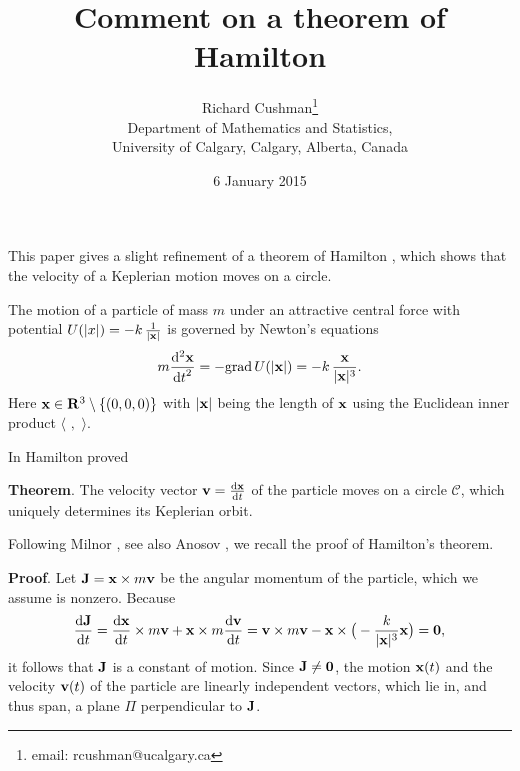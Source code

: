 \documentclass[11pt,openbib]{article}
\title{\textbf{Comment on a theorem of Hamilton}}
\author{Richard Cushman\thanks{email: rcushman@ucalgary.ca} \\ Department of Mathematics and Statistics, \\
University of Calgary, Calgary, Alberta, Canada}
\date{6 January 2015}
\newcommand{\dee}{\mathrm{d}}
\begin{document}
\maketitle
\noindent This paper gives a slight refinement of a theorem of Hamilton \cite{hamilton}, which shows that the velocity of a Keplerian motion moves on a circle. \medskip 

\noindent The motion of a particle of mass $m$ under an attractive central force with potential $U(|x|) = 
-k \,  \frac{1}{|{\bf x}|}$ 
is governed by Newton's equations
\begin{equation}
m \frac{{\dee }^2 {\bf x}}{{\dee t}^2} = -\mathrm{grad}\, U(|{\bf x}|) = -k \, \frac{{\bf x}}{|{\bf x}|^3}.
\label{eq-one}
\end{equation}
Here ${\bf x} \in {\bf R}^3 \setminus \{ (0,0,0) \}$ with $|{\bf x}|$ being the length of ${\bf x}$ using the Euclidean 
inner product $\langle \, \, , \, \, \rangle $.\medskip

\noindent In \cite{hamilton} Hamilton proved \medskip 

\noindent \textbf{Theorem}. The velocity vector ${\bf v} = \frac{\dee {\bf x}}{\dee t}$ of the particle moves 
on a circle $\mathcal{C}$, which uniquely determines its Keplerian orbit. \medskip 

\noindent Following Milnor \cite{milnor}, see also Anosov \cite{anosov}, we recall the proof of Hamilton's theorem. \medskip 

\noindent \textbf{Proof}. Let ${\bf J} = {\bf x} \times m{\bf v}$ be the angular momentum of the particle, which we 
assume is nonzero. Because 
\begin{displaymath}
\frac{\dee {\bf J}}{\dee t} = \frac{\dee {\bf x}}{\dee t} \times m{\bf v} + {\bf x} \times m\frac{\dee {\bf v}}{\dee t} 
={\bf v} \times m {\bf v} - {\bf x} \times \big( -\frac{k}{|{\bf x}|^3}{\bf x} \big) = {\bf 0}, 
\end{displaymath}
it follows that ${\bf J}$ is a constant of motion. Since ${\bf J} \ne {\bf 0}$, the motion ${\bf x}(t)$ and the 
velocity ${\bf v}(t)$ of the particle are linearly independent vectors, which lie in, and thus span, a plane $\Pi $ perpendicular to ${\bf J}$. \medskip 
\end{document}
